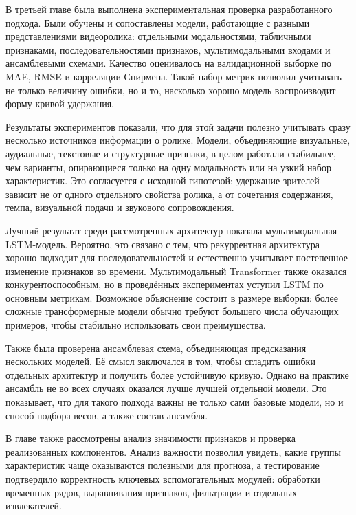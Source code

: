 \documentclass[times]{itmo-student-thesis}
\begin{document}
\chapterconclusion

В третьей главе была выполнена экспериментальная проверка разработанного подхода. Были обучены и сопоставлены модели, работающие с разными представлениями видеоролика: отдельными модальностями, табличными признаками, последовательностями признаков, мультимодальными входами и ансамблевыми схемами. Качество оценивалось на валидационной выборке по MAE, RMSE и корреляции Спирмена. Такой набор метрик позволил учитывать не только величину ошибки, но и то, насколько хорошо модель воспроизводит форму кривой удержания.

Результаты экспериментов показали, что для этой задачи полезно учитывать сразу несколько источников информации о ролике. Модели, объединяющие визуальные, аудиальные, текстовые и структурные признаки, в целом работали стабильнее, чем варианты, опирающиеся только на одну модальность или на узкий набор характеристик. Это согласуется с исходной гипотезой: удержание зрителей зависит не от одного отдельного свойства ролика, а от сочетания содержания, темпа, визуальной подачи и звукового сопровождения.

Лучший результат среди рассмотренных архитектур показала мультимодальная LSTM-модель. Вероятно, это связано с тем, что рекуррентная архитектура хорошо подходит для последовательностей и естественно учитывает постепенное изменение признаков во времени. Мультимодальный Transformer также оказался конкурентоспособным, но в проведённых экспериментах уступил LSTM по основным метрикам. Возможное объяснение состоит в размере выборки: более сложные трансформерные модели обычно требуют большего числа обучающих примеров, чтобы стабильно использовать свои преимущества.

Также была проверена ансамблевая схема, объединяющая предсказания нескольких моделей. Её смысл заключался в том, чтобы сгладить ошибки отдельных архитектур и получить более устойчивую кривую. Однако на практике ансамбль не во всех случаях оказался лучше лучшей отдельной модели. Это показывает, что для такого подхода важны не только сами базовые модели, но и способ подбора весов, а также состав ансамбля.

В главе также рассмотрены анализ значимости признаков и проверка реализованных компонентов. Анализ важности позволил увидеть, какие группы характеристик чаще оказываются полезными для прогноза, а тестирование подтвердило корректность ключевых вспомогательных модулей: обработки временных рядов, выравнивания признаков, фильтрации и отдельных извлекателей.
\end{document}
